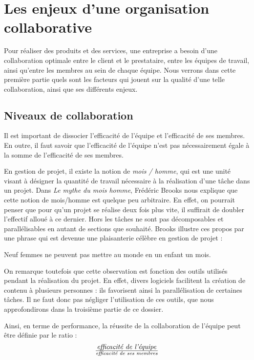 \chapter{Les enjeux d'une organisation collaborative}

Pour réaliser des produits et des services, une entreprise a besoin d'une collaboration optimale entre le client et le prestataire, entre les équipes de travail, ainsi qu'entre les membres au sein de chaque équipe. Nous verrons dans cette première partie quels sont les facteurs qui jouent sur la qualité d'une telle collaboration, ainsi que ses différents enjeux.

\section{Niveaux de collaboration}

Il est important de dissocier l'efficacité de l'équipe et l'efficacité de ses membres. En outre, il faut savoir que l'efficacité de l'équipe n'est pas nécessairement égale à la somme de l'efficacité de ses membres.

En gestion de projet, il existe la notion de \textit{mois / homme}, qui est une unité visant à désigner la quantité de travail nécessaire à la réalisation d'une tâche dans un projet. Dans \textit{Le mythe du mois homme}, Frédéric Brooks nous explique que cette notion de mois/homme est quelque peu arbitraire. En effet, on pourrait penser que pour qu'un projet se réalise deux fois plus vite, il suffirait de doubler l'effectif alloué à ce dernier. Hors les tâches ne sont pas décomposables et parallélisables en autant de sections que souhaité. Brooks illustre ces propos par une phrase qui est devenue une plaisanterie célèbre en gestion de projet : \begin{Quote}Neuf femmes ne peuvent pas mettre au monde en un enfant un mois.\end{Quote}

On remarque toutefois que cette observation est fonction des outils utilisés pendant la réalisation du projet. En effet, divers logiciels facilitent la création de contenu à plusieurs personnes : ils favorisent ainsi la parallélisation de certaines tâches. Il ne faut donc pas négliger l'utilisation de ces outils, que nous approfondirons dans la troisième partie de ce dossier.

Ainsi, en terme de performance, la réussite de la collaboration de l'équipe peut être définie par le ratio : \[\text{\textit{efficacité de l'équipe}} \over \text{\textit{efficacité de ses membres}}\]

